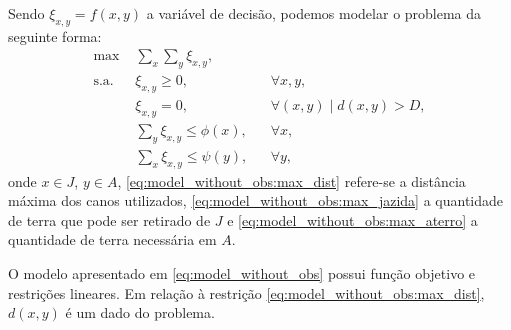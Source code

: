 Sendo $\xi_{x, y} = f(x, y)$ a variável de decisão, podemos modelar o problema
da seguinte forma:
\begin{subequations}
    \begin{align}
        \text{max } & \sum_{x} \sum_{y} \xi_{x, y},
        \label{eq:model_without_obs:obj_func} \\
        \text{s.a. } & \xi_{x, y} \geq 0, && \forall x, y,
        \label{eq:model_without_obs:var} \\
        & \xi_{x, y} = 0, && \forall (x, y) \mid d(x, y) > D,
        \label{eq:model_without_obs:max_dist} \\
        & \sum_{y} \xi_{x, y} \leq \phi(x), && \forall x,
        \label{eq:model_without_obs:max_jazida} \\
        & \sum_{x} \xi_{x, y} \leq \psi(y), && \forall y,
        \label{eq:model_without_obs:max_aterro}
    \end{align}
    \label{eq:model_without_obs}
\end{subequations}
onde $x \in J$, $y \in A$, \eqref{eq:model_without_obs:max_dist} refere-se a
distância máxima dos canos utilizados, \eqref{eq:model_without_obs:max_jazida} a
quantidade de terra que pode ser retirado de $J$ e
\eqref{eq:model_without_obs:max_aterro} a quantidade de terra necessária em $A$.

O modelo apresentado em \eqref{eq:model_without_obs} possui função objetivo e
restrições lineares. Em relação à restrição
\eqref{eq:model_without_obs:max_dist}, $d(x, y)$ é um dado do problema.

